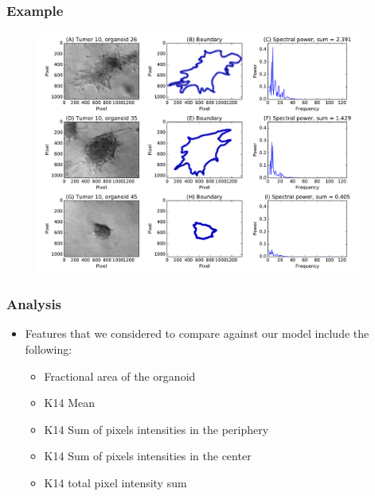 \documentclass{beamer} %
\begin{document}

\begin{frame}
	\frametitle{Example}
	\begin{figure}
		\centering
		\includegraphics[height=8cm]{fig1_CTN010.pdf}
	\end{figure}
\end{frame}

\begin{frame}
	\frametitle{Analysis}
	\begin{itemize}
			\item Features that we considered to compare against our model include the following:
			\begin{itemize}
					\item Fractional area of the organoid 
					\item K14 Mean
					\item K14 Sum of pixels intensities in the periphery
					\item K14 Sum of pixels intensities in the center
					\item K14 total pixel intensity sum 
			\end{itemize}
	\end{itemize}
\end{frame}
\end{document}
